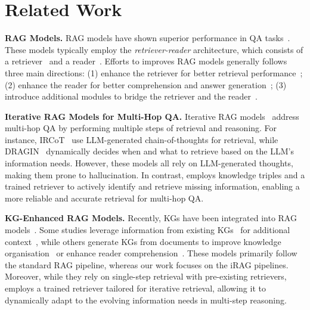 \section{Related Work}
\textbf{RAG Models.} 
RAG models have shown superior performance in QA tasks~\cite{lewis2020retrieval,izacard2020leveraging,ram2023context}. 
These models typically employ the \textit{retriever-reader} architecture, which consists of a retriever~\cite{karpukhin2020dense,wang2022text,fang2023kgpr} %
and a reader~\cite{izacard2020leveraging,jiang2023active}. 
Efforts to improves RAG models generally follows three main directions: 
(1) enhance the retriever for better retrieval performance~\cite{izacard2021distilling,shi2023replug,wang2024richrag}; 
(2) enhance the reader for better comprehension and answer generation~\cite{lin2024ra,xu2024unsupervised,wang2024rear}; 
(3) introduce additional modules to bridge the retriever and the reader~\cite{yu2023generate,xu2023recomp,ye2024r}. 

\vspace{0.5em} \noindent \textbf{Iterative RAG Models for Multi-Hop QA.}
Iterative RAG models~\cite{trivedi2023interleaving,shao2023enhancing,asai2024self,liu2024ra,yao2024seakr} address multi-hop QA by performing multiple steps of retrieval and reasoning. 
For instance, IRCoT~\cite{trivedi2023interleaving} use LLM-generated chain-of-thoughts for retrieval, while  DRAGIN~\cite{su2024dragin} dynamically decides when and what to retrieve based on the LLM's information needs. 
However, these models all rely on LLM-generated thoughts, making them prone to hallucination. In contrast, \OURS{} employs knowledge triples and a trained retriever to actively identify and retrieve missing information, enabling a more reliable and accurate retrieval for multi-hop QA. 

\vspace{0.5em} \noindent \textbf{KG-Enhanced RAG Models.} 
Recently, KGs have been integrated into RAG models~\cite{peng2024graph}. Some studies leverage information from existing KGs~\cite{vrandevcic2014wikidata} for additional context~\cite{yu2022kg,sun2024think}, while others generate KGs from documents to improve knowledge organisation~\cite{edge2024local,gutierrez2024hipporag,chen2024kg} or enhance reader comprehension~\cite{li2023leveraging,fang2024reano,fang2024trace,panda2024holmes}. 
These models primarily follow the standard RAG pipeline, whereas our work focuses on the iRAG pipelines. Moreover, while they rely on single-step retrieval with pre-existing retrievers, \OURS{} employs a trained retriever tailored for iterative retrieval, allowing it to dynamically adapt to the evolving information needs in multi-step reasoning.